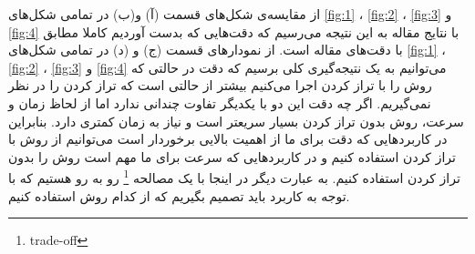 از مقایسه‌ی شکل‌های قسمت (آ) و(ب) در تمامی شکل‌های 
\ref{fig:1}
،
\ref{fig:2}
،
\ref{fig:3}
و
\ref{fig:4}
 با نتایج مقاله به این نتیجه می‌رسیم که دقت‌هایی که بدست آوردیم کاملا مطابق با دقت‌های مقاله است. از نمودار‌های قسمت (ج) و (د) در تمامی شکل‌های
\ref{fig:1}
،
\ref{fig:2}
،
\ref{fig:3}
و
\ref{fig:4}
می‌توانیم به یک نتیجه‌گیری کلی برسیم که دقت در حالتی که روش 
 را با تراز کردن اجرا می‌کنیم بیشتر از  حالتی است که تراز کردن را در نظر نمی‌گیریم. اگر چه دقت این دو با یکدیگر تفاوت چندانی ندارد اما از لحاظ زمان و سرعت، روش 
 بدون تراز کردن بسیار سریعتر است و نیاز به زمان کمتری دارد. بنابراین در کاربردهایی که دقت برای ما از اهمیت بالایی برخوردار است می‌توانیم از روش 
 با تراز کردن استفاده کنیم و در کاربردهایی که سرعت برای ما مهم است روش 
  را بدون تراز کردن استفاده کنیم. به عبارت دیگر در اینجا با یک مصالحه‌
  \footnote{trade-off}
   رو به رو هستیم که با توجه به کاربرد باید تصمیم بگیریم که از کدام روش استفاده کنیم. 
  
  